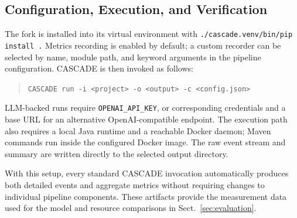 \subsection{Configuration, Execution, and Verification}
\label{sec:implementation-operation}

The fork is installed into its virtual environment with
\texttt{./cascade.venv/bin/pip install .} Metrics recording is enabled by
default; a custom recorder can be selected by name, module path, and keyword
arguments in the pipeline configuration. CASCADE is then invoked as follows:

\begin{quote}
\small\texttt{CASCADE run -i <project> -o <output> -c <config.json>}
\end{quote}

LLM-backed runs require \texttt{OPENAI\_API\_KEY}, or corresponding credentials
and a base URL for an alternative OpenAI-compatible endpoint. The execution path
also requires a local Java runtime and a reachable Docker daemon; Maven commands
run inside the configured Docker image. The raw event stream and summary are
written directly to the selected output directory.

With this setup, every standard CASCADE invocation automatically produces both
detailed events and aggregate metrics without requiring changes to individual
pipeline components. These artifacts provide the measurement data used for the
model and resource comparisons in Sect.~\ref{sec:evaluation}.


